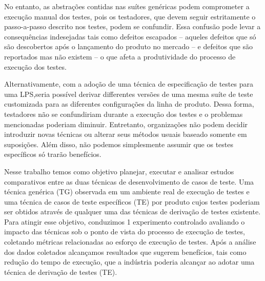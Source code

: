 No entanto, as abstrações contidas nas suítes genéricas podem comprometer a
execução manual dos testes, pois os testadores, que devem seguir estritamente o
passo-a-passo descrito nos testes, podem se confundir. Essa confusão pode levar
a consequências indesejadas tais como defeitos escapados -- aqueles defeitos que
só são descobertos após o lançamento do produto no mercado -- e defeitos que são
reportados mas não existem -- o que afeta a produtividade do processo de
execução dos testes.

Alternativamente, com a adoção de uma técnica de especificação de testes para
uma LPS,seria possível derivar differentes versões de uma mesma suíte de teste
customizada para as diferentes configurações da linha de produto. Dessa forma,
testadores não se confundiriam durante a execução dos testes e o problemas
mencionadas poderiam diminuir. Entretanto, organizações não podem decidir
introduzir novas técnicas ou alterar seus métodos usuais baseado somente em
suposições. Além disso, não podemos simplesmente assumir que os testes
específicos só trarão benefícios.


Nesse trabalho temos como objetivo planejar, executar e analisar estudos
comparativos entre as duas técnicas de desenvolvimento de casos de teste. Uma
técnica genérica (TG) observada em um ambiente real de execução de testes e uma
técnica de casos de teste específicos (TE) por produto cujos testes poderiam ser
obtidos através de qualquer uma das técnicas de derivação de testes existente.
Para atingir esse objetivo, conduzimos 1 experimento controlado avaliando o
impacto das técnicas sob o ponto de vista do processo de execução de testes,
coletando métricas relacionadas ao esforço de execução de testes. Após a
análise dos dados coletados alcançamos resultados que sugerem benefícios, tais
como redução do tempo de execução, que a indústria poderia alcançar ao adotar
uma técnica de derivação de testes (TE).




